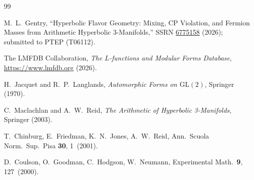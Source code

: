 \documentclass[11pt,a4paper]{article}
\theoremstyle{definition}
\begin{document}
\begin{thebibliography}{99}

M.~L.~Gentry,
``Hyperbolic Flavor Geometry: Mixing, CP Violation, and Fermion
Masses from Arithmetic Hyperbolic 3-Manifolds,''
SSRN \href{https://doi.org/10.2139/ssrn.6775158}{6775158} (2026);
submitted to PTEP (T06112).

The LMFDB Collaboration,
\emph{The $L$-functions and Modular Forms Database},
\url{https://www.lmfdb.org} (2026).

H.~Jacquet and R.~P.~Langlands,
\emph{Automorphic Forms on $\mathrm{GL}(2)$}, Springer (1970).

C.~Maclachlan and A.~W.~Reid,
\emph{The Arithmetic of Hyperbolic 3-Manifolds}, Springer (2003).

T.~Chinburg, E.~Friedman, K.~N.~Jones, A.~W.~Reid,
Ann.\ Scuola Norm.\ Sup.\ Pisa \textbf{30}, 1~(2001).

D.~Coulson, O.~Goodman, C.~Hodgson, W.~Neumann,
Experimental Math.\ \textbf{9}, 127~(2000).

\end{thebibliography}
\end{document}
